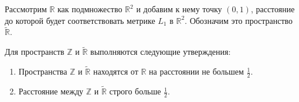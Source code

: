 \documentclass[11pt,twoside,draft
]{article}
\begin{document}
Рассмотрим $\mathbb{R}$ как подмножество
$\mathbb{R}^2$ и добавим к нему точку $(0,1)$, расстояние до которой будет
соответствовать метрике $L_{1}$ в $\mathbb{R}^2$. Обозначим это
пространство $\widetilde{\mathbb{R}}$.
\begin{theorem}
  Для пространств $\mathbb{Z}$ и $\widetilde{\mathbb{R}}$ выполняются следующие
  утверждения:
  \begin{enumerate}
    \item Пространства $\mathbb{Z}$ и $\widetilde{\mathbb{R}}$
      находятся от $\mathbb{R}$
      на расстоянии не большем $\frac 1 2$.\label{thrmPt:1}
    \item Расстояние между $\mathbb{Z}$ и $\widetilde{\mathbb{R}}$ строго
      больше $\frac 1 2$.\label{thrmPt:2}
  \end{enumerate}
  \label{thrmRUltraMetric}
\end{theorem}
\end{document}
